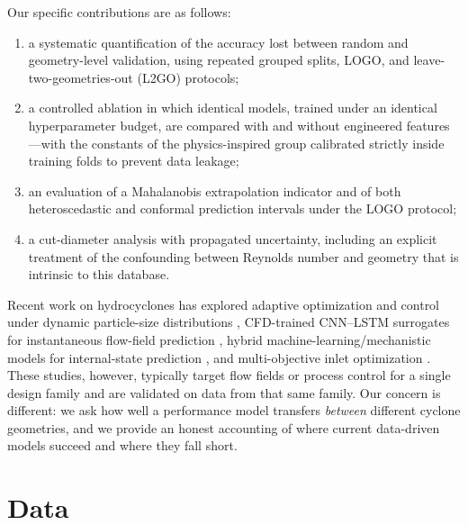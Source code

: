 \documentclass[12pt]{article}
\begin{document}
Our specific contributions are as follows:
\begin{enumerate}[label=(\roman*)]
\item a systematic quantification of the accuracy lost between random and geometry-level validation, using repeated grouped splits, LOGO, and leave-two-geometries-out (L2GO) protocols;
\item a controlled ablation in which identical models, trained under an identical hyperparameter budget, are compared with and without engineered features---with the constants of the physics-inspired group calibrated strictly inside training folds to prevent data leakage;
\item an evaluation of a Mahalanobis extrapolation indicator and of both heteroscedastic and conformal prediction intervals under the LOGO protocol;
\item a cut-diameter analysis with propagated uncertainty, including an explicit treatment of the confounding between Reynolds number and geometry that is intrinsic to this database.
\end{enumerate}

Recent work on hydrocyclones has explored adaptive optimization and control under dynamic particle-size distributions \cite{rineng}, CFD-trained CNN--LSTM surrogates for instantaneous flow-field prediction \cite{mineng,e2024}, hybrid machine-learning/mechanistic models for internal-state prediction \cite{seppur}, and multi-objective inlet optimization \cite{e2025}. These studies, however, typically target flow fields or process control for a single design family and are validated on data from that same family. Our concern is different: we ask how well a performance model transfers \emph{between} different cyclone geometries, and we provide an honest accounting of where current data-driven models succeed and where they fall short.

\section{Data}
\end{document}
